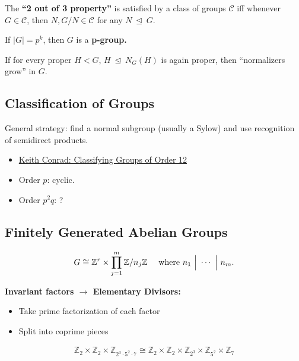 The \textbf{``2 out of 3 property''} is satisfied by a class of groups
\(\mathcal{C}\) iff whenever \(G \in \mathcal{C}\), then
\(N, G/N \in \mathcal{C}\) for any \(N {~\trianglelefteq~}G\).

If \({\left\lvert {G} \right\rvert} = p^k\), then \(G\) is a
\textbf{p-group.}

If for every proper \(H<G\), \(H{~\trianglelefteq~}N_G(H)\) is again
proper, then ``normalizers grow'' in \(G\).

\hypertarget{classification-of-groups}{%
\subsection{Classification of Groups}\label{classification-of-groups}}

General strategy: find a normal subgroup (usually a Sylow) and use
recognition of semidirect products.

\begin{itemize}
\tightlist
\item
  \href{https://kconrad.math.uconn.edu/blurbs/grouptheory/group12.pdf}{Keith
  Conrad: Classifying Groups of Order 12}
\item
  Order \(p\): cyclic.
\item
  Order \(p^2q\): ?
\end{itemize}

\hypertarget{finitely-generated-abelian-groups}{%
\subsection{Finitely Generated Abelian
Groups}\label{finitely-generated-abelian-groups}}

\begin{align*}
G \cong {\mathbb{Z}}^r \times \prod_{j=1}^m {\mathbb{Z}}/n_j{\mathbb{Z}}
\quad \text{ where } n_1 {~\Bigm|~}\cdots {~\Bigm|~}n_m
.\end{align*}

\textbf{Invariant factors \(\longrightarrow\) Elementary Divisors:}

\begin{itemize}
\tightlist
\item
  Take prime factorization of each factor
\item
  Split into coprime pieces
\end{itemize}

\begin{align*}
{\mathbb{Z}}_2 \times {\mathbb{Z}}_2 \times {\mathbb{Z}}_{2^3 \cdot 5^2 \cdot 7}
\cong
{\mathbb{Z}}_2 \times {\mathbb{Z}}_2 \times {\mathbb{Z}}_{2^3} \times {\mathbb{Z}}_{5^2} \times {\mathbb{Z}}_7
\end{align*}

